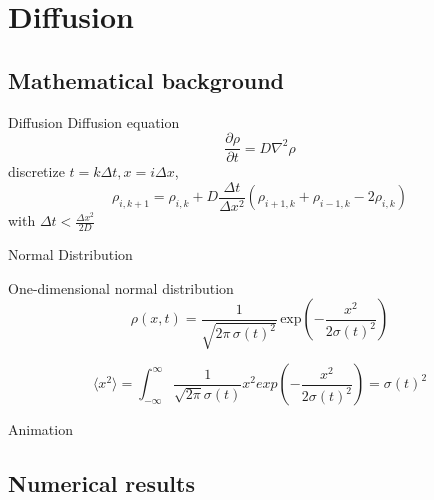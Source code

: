 \documentclass{beamer}
\begin{document}

\section{Diffusion}


\subsection{Mathematical background}

\begin{frame}{Diffusion}
\quad Diffusion equation
\begin{equation}
\frac{\partial\rho}{\partial t}=D\nabla^2\rho
\end{equation}
\quad discretize $t=k\Delta t, x=i\Delta x$,
\begin{equation}
\rho_{i,k+1}=\rho_{i,k}+D\frac{\Delta t}{\Delta x^2}(\rho_{i+1,k}+\rho_{i-1,k}-2\rho_{i,k})
\end{equation}
\quad \quad with $\Delta t<\frac{\Delta x^2}{2D}$
\end{frame}

\begin{frame}{Normal Distribution}

One-dimensional normal distribution
\begin{equation}
	\rho(x,t) = \frac{1}{\sqrt{2 \pi \, \sigma(t)^2}} \, \text{exp} \left( - \frac{x^2}{2\sigma(t)^2} \right)
\end{equation}

\begin{equation}
\langle x^2\rangle=\int_{-\infty}^{\infty}\frac{1}{\sqrt{2\pi}\sigma(t)}x^2exp(-\frac{x^2}{2\sigma(t)^2})=\sigma(t)^2
\end{equation}
\end{frame}

\begin{frame}{Animation}

\end{frame}

\subsection{Numerical results}
\end{document}
